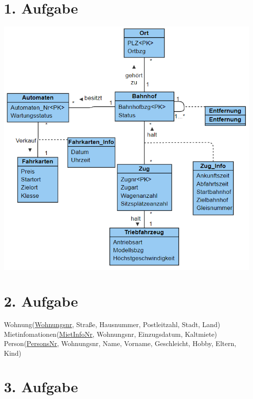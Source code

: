 \documentclass[fleqn]{article}
\begin{document}
\pagestyle{main}

\section{1. Aufgabe}

\includegraphics[scale=0.6]{UML.png}

\section{2. Aufgabe}

Wohnung(\underline{Wohnungsnr}, Straße, Hausnummer, Postleitzahl, Stadt, Land)\\
Mietinfomationen(\underline{MietInfoNr}, Wohnungsnr, Einzugsdatum, Kaltmiete)\\
Person(\underline{PersonsNr}, Wohnungsnr, Name, Vorname, Geschleicht, Hobby, Eltern, Kind)\\

\section{3. Aufgabe}
\end{document}
